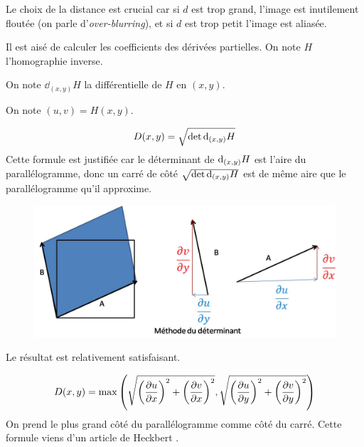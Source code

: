 Le choix de la distance est crucial car si $d$ est trop grand, l'image est inutilement floutée (on parle d'\emph{over-blurring}), et si $d$ est trop petit l'image est aliasée.

Il est aisé de calculer les coefficients des dérivées partielles. On note $H$ l'homographie inverse.



On note $\dd_{(x,y)} H$ la différentielle de $H$ en $(x,y)$.

On note $(u,v)=H(x,y)$.

$$D(x,y) = \sqrt{\det \textrm{d}_{(x,y)} H}$$
Cette formule est justifiée car le déterminant de $\textrm{d}_{(x,y)} H$ est l'aire du parallélogramme, donc un carré de côté $\sqrt{\det \textrm{d}_{(x,y)} H}$ est de même aire que le parallélogramme qu'il approxime.

\begin{figure}[h!]
\centering
\includegraphics[scale=0.5]{methode_determinant.jpg}
\end{figure}


Le résultat est relativement satisfaisant.


$$ D(x,y) = \max \left(\sqrt{\left(\frac{\partial u}{\partial x}\right)^2 + \left(\frac{\partial v}{\partial x}\right)^2},\sqrt{\left(\frac{\partial u}{\partial y}\right)^2 + \left(\frac{\partial v}{\partial y}\right)^2}\right)$$
On prend le plus grand côté du parallélogramme comme côté du carré. Cette formule viens d'un article de Heckbert \cite{heckbert1983texture}.


